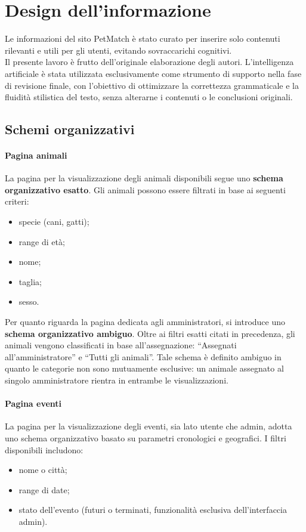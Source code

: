 \section{Design dell'informazione}
\label{sec:architettura_informazione}
Le informazioni del sito PetMatch è stato curato per inserire solo contenuti rilevanti e utili per gli utenti, evitando sovraccarichi cognitivi.\\
Il presente lavoro è frutto dell'originale elaborazione degli autori. L'intelligenza artificiale è stata utilizzata esclusivamente come strumento di supporto nella fase di revisione finale, con l'obiettivo di ottimizzare la correttezza grammaticale e la fluidità stilistica del testo, senza alterarne i contenuti o le conclusioni originali.
\subsection{Schemi organizzativi}
\paragraph{Pagina animali}
La pagina per la visualizzazione degli animali disponibili segue uno \textbf{schema organizzativo esatto}. Gli animali possono essere filtrati in base ai seguenti criteri:
\begin{itemize}
    \item specie (cani, gatti);
    \item range di età;
    \item nome;
    \item taglia; 
    \item sesso.
\end{itemize}
Per quanto riguarda la pagina dedicata agli amministratori, si introduce uno \textbf{schema organizzativo ambiguo}. Oltre ai filtri esatti citati in precedenza, gli animali vengono 
classificati in base all'assegnazione: ``Assegnati all'amministratore'' e ``Tutti gli animali''. Tale schema è definito ambiguo in quanto le categorie non sono mutuamente esclusive: 
un animale assegnato al singolo amministratore rientra in entrambe le visualizzazioni.
\paragraph{Pagina eventi}
La pagina per la visualizzazione degli eventi, sia lato utente che admin, adotta uno schema organizzativo basato su parametri cronologici e geografici. I filtri disponibili includono:
\begin{itemize}
    \item nome o città;
    \item range di date;
    \item stato dell'evento (futuri o terminati, funzionalità esclusiva dell'interfaccia admin).
\end{itemize}

